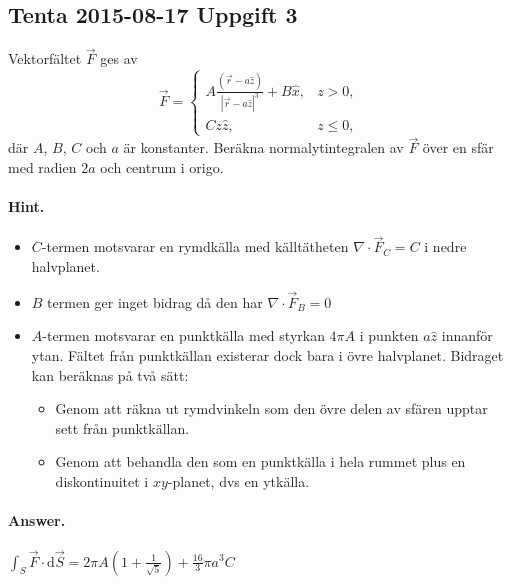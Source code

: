 \documentclass[%
oneside,                 %
final,                   %
10pt]{article}
\newenvironment{doconceexercise}{}{}
\newcounter{doconceexercisecounter}
\begin{document}
\begin{doconceexercise}

\subsection*{Tenta 2015-08-17 Uppgift 3}

Vektorfältet $\vec{F}$ ges av 
$$
\vec{F} = \left\{
\begin{array}{ll}
  A \frac{(\vec{r} - a\hat{z})}{| \vec{r} - a \hat{z}|^3} + B \hat{x}, & z>0, \\
  C z \hat{z}, & z \le 0,
\end{array}
\right.
$$
där $A$, $B$, $C$ och $a$ är konstanter. Beräkna normalytintegralen av
$\vec{F}$ över en sfär med radien $2a$ och centrum i origo.


\paragraph{Hint.}
\begin{itemize}
\item $C$-termen motsvarar en rymdkälla med källtätheten $\nabla \cdot \vec{F}_C = C$ i nedre halvplanet.

\item $B$ termen ger inget bidrag då den har $\nabla \cdot \vec{F}_B = 0$

\item $A$-termen motsvarar en punktkälla med styrkan $4 \pi A$ i punkten $a \hat{z}$ innanför ytan. Fältet från punktkällan existerar dock bara i övre halvplanet. Bidraget kan beräknas på två sätt:
\begin{itemize}

  \item Genom att räkna ut rymdvinkeln som den övre delen av sfären upptar sett från punktkällan.

  \item Genom att behandla den som en punktkälla i hela rummet plus en diskontinuitet i $xy$-planet, dvs en ytkälla.
\end{itemize}

\noindent
\end{itemize}

\noindent


\paragraph{Answer.}
$\int_S \vec{F} \cdot \mbox{d}\vec{S} = 2
\pi A \left(1 + \frac{1}{\sqrt{5}} \right) + \frac{16}{3} \pi a^3 C$


\end{doconceexercise}
\end{document}
